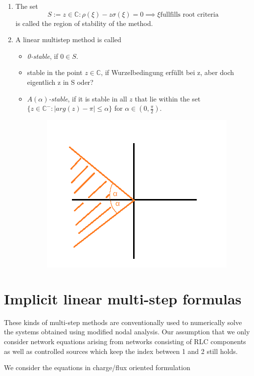 	\begin{definition}
		\begin{enumerate}
			\item 
			The set
			\begin{equation}
				S := {z \in \mathbb{C} : \rho(\xi) - z \sigma(\xi) = 0 \implies \xi \text{fullfills root criteria}}
			\end{equation}
			is called the region of stability of the method.
			\item 
			A linear multistep method is called
			\begin{itemize}
				\item \emph{0-stable}, if $0 \in S$.
				\item stable in the point $z \in \mathbb{C}$, if Wurzelbedingung erfüllt bei z, aber doch eigentlich z in S oder?
				\item \emph{$A(\alpha)$-stable}, if it is stable in all $z$ that lie within the set $\{z \in \mathbb{C}^- : |arg(z)-\pi| \leq \alpha\}$ for $\alpha \in (0, \frac{\pi}{2})$.
				 \begin{figure}[H]
				 	\centering
				 	\includegraphics[width=0.3\linewidth]{screenshot021}
				 	\caption{}
				 	\label{fig:screenshot021}
				 \end{figure}
				 
			\end{itemize}
		\end{enumerate}
	\end{definition}
	

\section{Implicit linear multi-step formulas}
These kinds of multi-step methods are conventionally used to numerically solve the systems obtained using modified nodal analysis. Our assumption that we only consider network equations arising from networks consisting of RLC components as well as controlled sources which keep the index between 1 and 2 still holds.

We consider the equations in charge/flux oriented formulation

